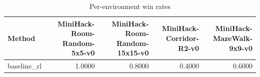 \begin{table}[htbp]
\centering
\caption{Per-environment win rates}
\label{tab:per-env}
\begin{tabular}{lrrrr}
\toprule
\textbf{Method} & \textbf{MiniHack-Room-Random-5x5-v0} & \textbf{MiniHack-Room-Random-15x15-v0} & \textbf{MiniHack-Corridor-R2-v0} & \textbf{MiniHack-MazeWalk-9x9-v0} \\
\midrule
baseline\_rl & 1.0000 & 0.8000 & 0.4000 & 0.6000 \\
\bottomrule
\end{tabular}
\end{table}